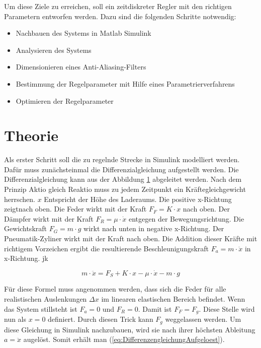 	Um diese Ziele zu erreichen, soll ein zeitdiskreter Regler mit den
	richtigen Parametern entworfen werden. Dazu sind die
	folgenden Schritte notwendig:



	\begin{itemize}
		\item Nachbauen des Systems in Matlab Simulink
		\item Analysieren des Systems
		\item Dimensionieren eines Anti-Aliasing-Filters
		\item Bestimmung der Regelparameter mit Hilfe eines Parametrierverfahrens
		\item Optimieren der Regelparameter
	\end{itemize}
		
	\section{Theorie}
	Als erster Schritt soll die zu regelnde Strecke in Simulink modelliert werden. Dafür muss zunächsteinmal die Differenzialgleichung aufgestellt werden.
	Die Differenzialgleichung kann aus der Abbildung \ref{} abgeleitet werden. 
	Nach dem Prinzip Aktio gleich Reaktio muss zu jedem Zeitpunkt ein Kräftegleichgewicht herrschen.
	$x$ Entspricht der Höhe des Laderaums. Die positive x-Richtung zeigtnach oben. Die Feder wirkt mit der Kraft $F_{F} = K \cdot x$ nach oben. Der Dämpfer wirkt mit der Kraft 
	$F_{R} = \mu \cdot \dot{x}$ entgegen der Bewegungsrichtung. Die Gewichtskraft $F_{G} = m \cdot g $ wirkt nach unten in negative x-Richtung. Der Pneumatik-Zyliner 
	wirkt mit der Kraft  nach oben. Die Addition dieser Kräfte mit richtigem Vorzeichen ergibt die resultierende Beschleunigungskraft $F_{a} = m \cdot \ddot{x}$
	in x-Richtung. jk

	\begin{equation}
		m \cdot \ddot{x} = F_{S} + K \cdot x - \mu \cdot \dot{x} - m \cdot g
		\label{eq:Differenzengleichung}
	\end{equation}

	Für diese Formel muss angenommen werden, dass sich die Feder für alle realistischen Auslenkungen $\Delta x$ im linearen elastischen Bereich befindet. Wenn das System stillsteht ist $F_{a} = 0$ 
	und $F_{R} = 0$. Damit ist $F_{F} = F_{g}$. Diese Stelle wird nun als $x = 0$ definiert. Durch diesen Trick kann $F_{g}$ weggelassen werden. 
	Um diese Gleichung in Simulink nachzubauen, wird sie nach ihrer höchsten Ableitung $a = \ddot{x}$ augelöst. Somit erhält man (\ref{eq:DifferenzengleichungAufgeloest}).

